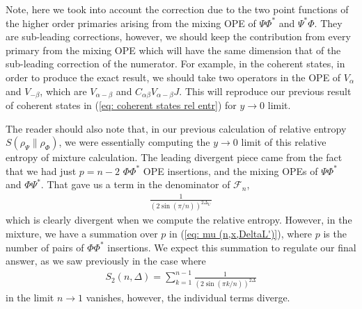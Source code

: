 \documentclass[11pt]{article}
\begin{document}
Note, here we took into account the correction due to the two point functions of the higher order primaries arising from the mixing OPE of $\Psi \Phi^*$ and $\Psi^* \Phi$. They are sub-leading corrections, however, we should keep the contribution from every primary from the mixing OPE which will have the same dimension that of the sub-leading correction of the numerator. For example, in the coherent states, in order to produce the exact result, we should take two operators in the OPE of $V_\alpha$ and $V_{-\beta}$, which are $V_{\alpha - \beta}$ and $C_{\alpha\beta} V_{\alpha-\beta}J$. This will reproduce our previous result of coherent states in (\ref{eq: coherent states rel entr}) for $y\to 0$ limit. 

The reader should also note that, in our previous calculation of relative entropy $S(\rho_\Psi \| \rho_\Phi)$, we were essentially computing the $y \to 0$ limit of this relative entropy of mixture calculation. The leading divergent piece came from the fact that we had just $p=n-2$ $\Phi \Phi^*$ OPE insertions, and the mixing OPEs of $\Psi \Phi^*$ and $\Phi \Psi^*$. That gave us a term in the denominator of $\mathcal{F}_n$,
\begin{align}
    \frac{1}{(2\sin (\pi/n))^{2\Delta_{L'}}}
\end{align}
which is clearly divergent when we compute the relative entropy. However, in the mixture, we have a summation over $p$ in (\ref{eq: mu (n,x,DeltaL')}), where $p$ is the number of pairs of $\Phi \Phi^*$ insertions. We expect this summation to regulate our final answer, as we saw previously in the case where 
\begin{align}
    S_2(n,\Delta) = \sum_{k=1}^{n-1}\frac{1}{(2\sin(\pi k/n))^{2\Delta}}
\end{align}
in the limit $n\to 1$ vanishes, however, the individual terms diverge. 
\end{document}
